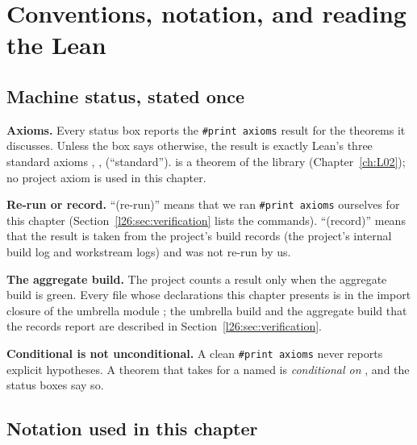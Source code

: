 \section{Conventions, notation, and reading the Lean}\label{l26:sec:conventions}

\subsection{Machine status, stated once}\label{l26:sec:statusconv}

\textbf{Axioms.} Every status box reports the \texttt{\#print axioms} result for the theorems it discusses. Unless the box
says otherwise, the result is exactly Lean's three standard axioms , , 
(``standard'').  is a theorem of the library (Chapter~\ref{ch:L02}); no project axiom is used in this chapter.

\textbf{Re-run or record.} ``(re-run)'' means that we ran \texttt{\#print axioms} ourselves for this chapter
(Section~\ref{l26:sec:verification} lists the commands). ``(record)'' means that the result is taken from the project's
build records (the project's internal build log and workstream logs) and was not re-run by us.

\textbf{The aggregate build.} The project counts a result only when the aggregate build is green. Every file whose
declarations this chapter presents is in the import closure of the umbrella module ; the umbrella build and
the aggregate build that the records report are described in Section~\ref{l26:sec:verification}.

\textbf{Conditional is not unconditional.} A clean \texttt{\#print axioms} never reports explicit hypotheses. A theorem that
takes  for a named   is \emph{conditional on} , and the status boxes say so.

\subsection{Notation used in this chapter}\label{l26:sec:notation}

